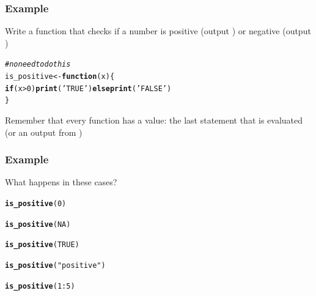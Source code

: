 \documentclass[12pt]{beamer}\usepackage[]{graphicx}\usepackage[]{color}
\makeatletter
\newcommand{\hlnum}[1]{\textcolor[rgb]{0.686,0.059,0.569}{#1}}%
\newcommand{\hlstr}[1]{\textcolor[rgb]{0.192,0.494,0.8}{#1}}%
\newcommand{\hlcom}[1]{\textcolor[rgb]{0.678,0.584,0.686}{\textit{#1}}}%
\newcommand{\hlopt}[1]{\textcolor[rgb]{0,0,0}{#1}}%
\newcommand{\hlstd}[1]{\textcolor[rgb]{0.345,0.345,0.345}{#1}}%
\newcommand{\hlkwa}[1]{\textcolor[rgb]{0.161,0.373,0.58}{\textbf{#1}}}%
\newcommand{\hlkwb}[1]{\textcolor[rgb]{0.69,0.353,0.396}{#1}}%
\newcommand{\hlkwc}[1]{\textcolor[rgb]{0.333,0.667,0.333}{#1}}%
\newcommand{\hlkwd}[1]{\textcolor[rgb]{0.737,0.353,0.396}{\textbf{#1}}}%
\newenvironment{kframe}{%
 \def\at@end@of@kframe{}%
 \ifinner\ifhmode%
  \def\at@end@of@kframe{\end{minipage}}%
  \begin{minipage}{\columnwidth}%
 \fi\fi%
 \def\FrameCommand##1{\hskip\@totalleftmargin \hskip-\fboxsep
 \colorbox{shadecolor}{##1}\hskip-\fboxsep
     \hskip-\linewidth \hskip-\@totalleftmargin \hskip\columnwidth}%
 \MakeFramed {\advance\hsize-\width
   \@totalleftmargin\z@ \linewidth\hsize
   \@setminipage}}%
 {\par\unskip\endMakeFramed%
 \at@end@of@kframe}
\newenvironment{knitrout}{}{} %
\makeatother
\begin{document}

\begin{frame}[fragile]
\frametitle{Example}

Write a function that checks if a number is positive (output ) or negative (output )

\begin{knitrout}\footnotesize
{}\color{fgcolor}\begin{kframe}
\begin{alltt}
\hlcom{# no need to do this}
\hlstd{is_positive} \hlkwb{<-} \hlkwa{function}\hlstd{(}\hlkwc{x}\hlstd{) \{}
  \hlkwa{if} \hlstd{(x} \hlopt{>} \hlnum{0}\hlstd{)} \hlkwd{print}\hlstd{(}\hlstr{'TRUE'}\hlstd{)} \hlkwa{else} \hlkwd{print}\hlstd{(}\hlstr{'FALSE'}\hlstd{)}
\hlstd{\}}
\end{alltt}
\end{kframe}
\end{knitrout}

{\lolit Remember that every function has a value: the last statement that is evaluated (or an output from )}

\end{frame}


\begin{frame}[fragile]
\frametitle{Example}

What happens in these cases?
\begin{knitrout}\footnotesize
{}\color{fgcolor}\begin{kframe}
\begin{alltt}
\hlkwd{is_positive}\hlstd{(}\hlnum{0}\hlstd{)}

\hlkwd{is_positive}\hlstd{(}\hlnum{NA}\hlstd{)}

\hlkwd{is_positive}\hlstd{(}\hlnum{TRUE}\hlstd{)}

\hlkwd{is_positive}\hlstd{(}\hlstr{"positive"}\hlstd{)}

\hlkwd{is_positive}\hlstd{(}\hlnum{1}\hlopt{:}\hlnum{5}\hlstd{)}
\end{alltt}
\end{kframe}
\end{knitrout}

\end{frame}

\end{document}
